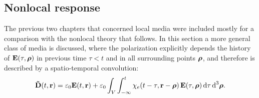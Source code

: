 \subsection{Nonlocal response} %
The previous two chapters that concerned local media were included mostly for a comparison with the nonlocal theory that follows.
In this section a more general class of media is discussed, where the polarization explicitly depends the history of $\mathbf{E}(\tau, \boldsymbol{\rho})$ in previous time $\tau < t$ and in all surrounding points $\boldsymbol{\rho}$, and therefore is described by a spatio-temporal convolution:
\begin{equation} \mathbf{\tilde{D}}(t,{\mathbf{r}}) = \varepsilon_0 \mathbf{E}(t,{\mathbf{r}}) + \varepsilon_0\int_{V} \int_{-\infty}^{t} \chi_e(t-\tau, {\mathbf{r}}-\boldsymbol{\rho}) \, \mathbf{E}(\tau,\boldsymbol{\rho}) \,\mbox{d}\tau \,\mbox{d}^3\boldsymbol{\rho}. \label{eq_chi_convol_nonloc}\end{equation}
